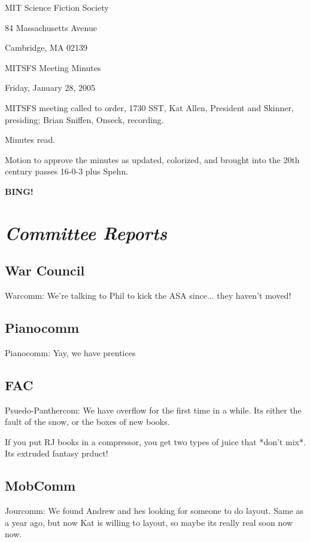 \documentclass[10pt]{article}
\newcommand{\bing}{{\bf BING!} }
\newcommand{\goto}[1]{\bing \vskip 12pt \section*{{\em{#1}}}}
\newcommand{\ps}{ plus Spehn\xspace}
\begin{document}
\begin{center}

MIT Science Fiction Society

84 Massachusetts Avenue

Cambridge, MA 02139

\vspace{12pt}

MITSFS Meeting Minutes

Friday, January 28, 2005

\end{center}

\vspace{18pt}

\setlength{\parskip}{6pt}

\noindent
MITSFS meeting called to order, 1730 SST, Kat Allen, President and
Skinner, presiding; Brian Sniffen,  Onseck, recording.

Minutes read.

Motion to approve the minutes as updated, colorized, and brought into
the 20th century passes 16-0-3\ps.


\goto{Committee Reports}
\subsection*{War Council}
Warcomm:  We're talking to Phil to kick the ASA since... they haven't moved!

\subsection*{Pianocomm}
Pianocomm:  Yay, we have prentices

\subsection*{FAC}
Psuedo-Panthercom:  We have overflow for the first time in a while.  Its either the fault of the snow, or the boxes of new books.

If you put RJ books in a compressor, you get two types of juice that *don't mix*.  Its extruded fantasy prduct!

\subsection*{MobComm}
Jourcomm: We found Andrew and hes looking for someone to do layout.
Same as a year ago, but now Kat is willing to layout, so maybe its
really real soon now now.
\end{document}
